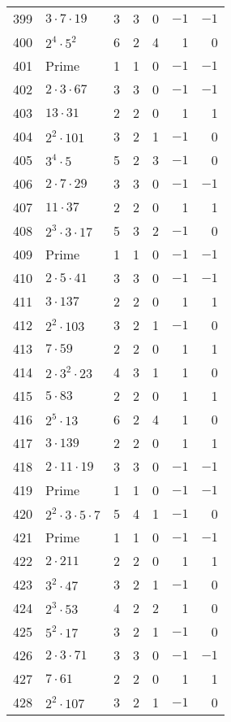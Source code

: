 \documentclass[12pt]{article}
\begin{document}
\begin{tabular}{|r|l|r|r|r|r|r|}
399 & $3 \cdot 7 \cdot 19$ & 3 & 3 & 0 & $-1$ & $-1$ \\
400 & $2^4 \cdot 5^2$ & 6 & 2 & 4 & 1 & 0 \\
401 & Prime & 1 & 1 & 0 & $-1$ & $-1$ \\
402 & $2 \cdot 3 \cdot 67$ & 3 & 3 & 0 & $-1$ & $-1$ \\
403 & $13 \cdot 31$ & 2 & 2 & 0 & 1 & 1 \\
404 & $2^2 \cdot 101$ & 3 & 2 & 1 & $-1$ & 0 \\
405 & $3^4 \cdot 5$ & 5 & 2 & 3 & $-1$ & 0 \\
406 & $2 \cdot 7 \cdot 29$ & 3 & 3 & 0 & $-1$ & $-1$ \\
407 & $11 \cdot 37$ & 2 & 2 & 0 & 1 & 1 \\
408 & $2^3 \cdot 3 \cdot 17$ & 5 & 3 & 2 & $-1$ & 0 \\
409 & Prime & 1 & 1 & 0 & $-1$ & $-1$ \\
410 & $2 \cdot 5 \cdot 41$ & 3 & 3 & 0 & $-1$ & $-1$ \\
411 & $3 \cdot 137$ & 2 & 2 & 0 & 1 & 1 \\
412 & $2^2 \cdot 103$ & 3 & 2 & 1 & $-1$ & 0 \\
413 & $7 \cdot 59$ & 2 & 2 & 0 & 1 & 1 \\
414 & $2 \cdot 3^2 \cdot 23$ & 4 & 3 & 1 & 1 & 0 \\
415 & $5 \cdot 83$ & 2 & 2 & 0 & 1 & 1 \\
416 & $2^5 \cdot 13$ & 6 & 2 & 4 & 1 & 0 \\
417 & $3 \cdot 139$ & 2 & 2 & 0 & 1 & 1 \\
418 & $2 \cdot 11 \cdot 19$ & 3 & 3 & 0 & $-1$ & $-1$ \\
419 & Prime & 1 & 1 & 0 & $-1$ & $-1$ \\
420 & $2^2 \cdot 3 \cdot 5 \cdot 7$ & 5 & 4 & 1 & $-1$ & 0 \\
421 & Prime & 1 & 1 & 0 & $-1$ & $-1$ \\
422 & $2 \cdot 211$ & 2 & 2 & 0 & 1 & 1 \\
423 & $3^2 \cdot 47$ & 3 & 2 & 1 & $-1$ & 0 \\
424 & $2^3 \cdot 53$ & 4 & 2 & 2 & 1 & 0 \\
425 & $5^2 \cdot 17$ & 3 & 2 & 1 & $-1$ & 0 \\
426 & $2 \cdot 3 \cdot 71$ & 3 & 3 & 0 & $-1$ & $-1$ \\
427 & $7 \cdot 61$ & 2 & 2 & 0 & 1 & 1 \\
428 & $2^2 \cdot 107$ & 3 & 2 & 1 & $-1$ & 0 \\

\end{tabular}
\end{document}
